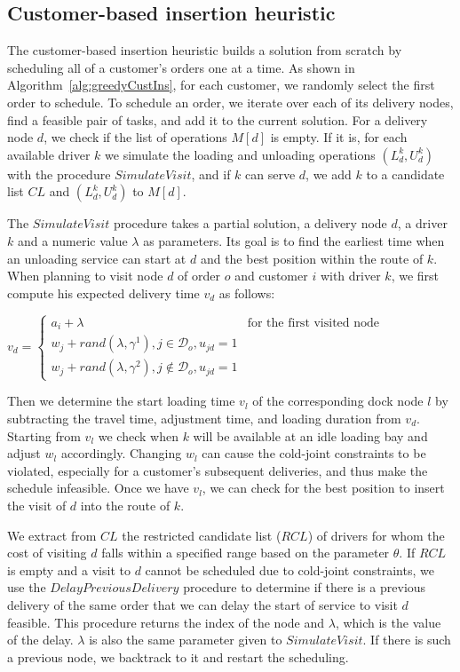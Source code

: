 \subsection{Customer-based insertion heuristic}

The customer-based insertion heuristic builds a solution from scratch by scheduling all of a customer's orders one at a time. As shown in Algorithm~\ref{alg:greedyCustIns}, for each customer, we randomly select the first order to schedule. To schedule an order, we iterate over each of its delivery nodes, find a feasible pair of tasks, and add it to the current solution. For a delivery node $d$, we check if the list of operations $M[d]$ is empty. If it is, for each available driver $k$ we simulate the loading and unloading operations $(L^k_d,U^k_d)$ with the procedure $SimulateVisit$, and if $k$ can serve $d$, we add $k$ to a candidate list $CL$ and $(L^k_d,U^k_d)$ to $M[d]$.

The $SimulateVisit$ procedure takes a partial solution, a delivery node $d$, a driver $k$ and a numeric value $\lambda$ as parameters. Its goal is to find the earliest time when an unloading service can start at $d$ and the best position within the route of $k$. When planning to visit node $d$ of order $o$ and customer $i$ with driver $k$, we first compute his expected delivery time $v_d$ as follows:

$ v_d = \left\{
    \begin{array}{rl}
        a_i + \lambda                                                   & \text{for the first visited node} \\
        w_j + rand(\lambda, \gamma^1), j \in \mathcal{D}_o,  u_{jd}=1   &                                   \\
        w_j + rand(\lambda, \gamma^2), j \notin \mathcal{D}_o, u_{jd}=1 &
    \end{array}
    \right.$

Then we determine the start loading time $v_l$ of the corresponding dock node $l$ by subtracting the travel time, adjustment time, and loading duration from $v_d$. Starting from $v_l$ we check when $k$ will be available at an idle loading bay and adjust $w_l$ accordingly. Changing $w_l$ can cause the cold-joint constraints to be violated, especially for a customer's subsequent deliveries, and thus make the schedule infeasible. Once we have $v_l$, we can check for the best position to insert the visit of $d$ into the route of $k$.

We extract from $CL$ the restricted candidate list ($RCL$) of drivers for whom the cost of visiting $d$ falls within a specified range based on the parameter $\theta$. If $RCL$ is empty and a visit to $d$ cannot be scheduled due to cold-joint constraints, we use the $DelayPreviousDelivery$ procedure to determine if there is a previous delivery of the same order that we can delay the start of service to visit $d$ feasible. This procedure returns the index of the node and $\lambda$, which is the value of the delay. $\lambda$ is also the same parameter given to $SimulateVisit$. If there is such a previous node, we backtrack to it and restart the scheduling.

